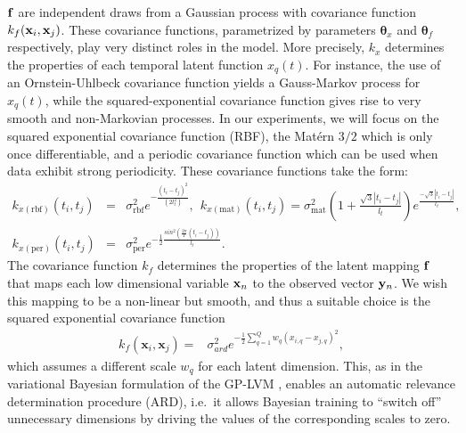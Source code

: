 \documentclass{article} %
\begin{document}
$\mathbf{f}$ are independent draws from a Gaussian process with covariance
function $k_f(\mathbf{x}_i,\mathbf{x}_j)$.  These covariance functions,
parametrized by parameters $\boldsymbol \theta_x$ and $\boldsymbol
\theta_f$ respectively, play very distinct roles in the model. More
precisely, $k_x$ determines the properties of each temporal latent
function $x_q(t)$. For instance, the use of an Ornstein-Uhlbeck
covariance function yields a Gauss-Markov process for $x_q(t)$, while
the squared-exponential covariance function gives rise to very smooth and
non-Markovian processes. In our experiments, we will focus on the squared exponential
covariance function (RBF), the Mat\'ern $3/2$ which is only once
differentiable, and a periodic covariance function
\cite{rasmussen-williams, MacKay98} which can be used when data
exhibit strong periodicity. These covariance functions take the form:
\begin{eqnarray}
k_{x(\text{rbf})} \left( \mathit{t_i, t_j} \right) 
& = & \sigma_{\text{rbf}}^2 e^{- \frac{\left( t_i - t_j \right)^2}{\left(
      2l_t^2 \right)}}, 
\ \ k_{x(\text{mat})} \left( t_i, t_j \right) =  
\sigma_{\text{mat}}^2 \left( 1 + \frac{\sqrt{3} |t_i - t_j|}{l_t} \right)
		e^{\frac{ - \sqrt{3} |t_i - t_j|}{l_t} }, \nonumber \\
k_{x(\text{per})} \left( \mathit{t_i, t_j} \right) 
& = & 
	\sigma_{\text{per}}^2 e^{-\frac{1}{2} \frac{sin^2 \left( \frac{2
                \pi}{T} \left( t_i - t_j \right) \right) }{l_t} }. 
 \label{eq:temporalkernels}
\end{eqnarray}
The covariance function $k_f$ determines the properties of the latent
mapping $\mathbf{f}$ that maps each low dimensional variable $\mathbf{x}_n$ to the
observed vector $\mathbf{y}_n$. We wish this mapping to be a non-linear but
smooth, and thus a suitable choice is the squared exponential
covariance function
\begin{align}
\mathit{k_f} \left( \mathbf{x}_i, \mathbf{x}_j \right) = {} &  
		\sigma_{ard}^2 e^{
			- \frac{1}{2} \sum_{q=1}^{Q}  w_q \left(
                          \mathit{x_{i,q} - x_{j,q}} \right) ^2 },
\label{rbfard}
\end{align}
which assumes a different scale $w_q$ for each latent dimension. This,
as in the variational Bayesian formulation of the GP-LVM
\cite{BayesianGPLVM}, enables an automatic relevance determination
procedure (ARD), i.e.\ it allows Bayesian training to ``switch off''
unnecessary dimensions by driving the values of the corresponding
scales to zero.
\end{document}
